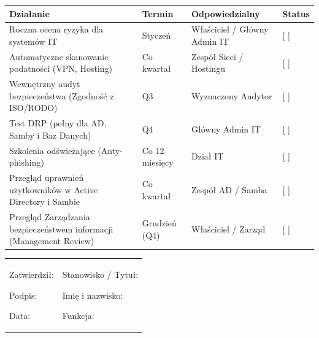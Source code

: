 \documentclass[12pt,a4paper]{article}
\begin{document}
\begin{longtable}[]{@{}>{\raggedright\arraybackslash}p{}>{\raggedright\arraybackslash}p{}>{\raggedright\arraybackslash}p{}>{\raggedright\arraybackslash}p{}@{}}
\toprule\noalign{}
Działanie & Termin & Odpowiedzialny & Status \\
\midrule\noalign{}
\endhead
\bottomrule\noalign{}
\endlastfoot
Roczna ocena ryzyka dla systemów IT & Styczeń & Właściciel / Główny Admin IT & {[} {]} \underline{\hspace{2cm}} \\
Automatyczne skanowanie podatności (VPN, Hosting) & Co kwartał & Zespół Sieci / Hostingu & {[} {]} \underline{\hspace{2cm}} \\
Wewnętrzny audyt bezpieczeństwa (Zgodność z ISO/RODO) & Q3 & Wyznaczony Audytor & {[} {]} \underline{\hspace{2cm}} \\
Test DRP (pełny dla AD, Samby i Baz Danych) & Q4 & Główny Admin IT & {[} {]} \underline{\hspace{2cm}} \\
Szkolenia odświeżające (Anty-phishing) & Co 12 miesięcy & Dział IT & {[} {]} \underline{\hspace{2cm}} \\
Przegląd uprawnień użytkowników w Active Directory i Sambie & Co kwartał & Zespół AD / Samba & {[} {]} \underline{\hspace{2cm}} \\
Przegląd Zarządzania bezpieczeństwem informacji (Management Review) & Grudzień (Q4) & Właściciel / Zarząd & {[} {]}\underline{\hspace{2cm}} \\
\end{longtable}

\begin{longtable}[]{@{}
  >{\raggedright\arraybackslash}p{}
  >{\raggedright\arraybackslash}p{}@{}}
\toprule\noalign{}
\endhead
\bottomrule\noalign{}
\endlastfoot
\begin{minipage}[t]{\linewidth}\raggedright
Zatwierdził:

Podpis: \underline{\hspace{3cm}}

Data: \underline{\hspace{4cm}}
\end{minipage} & \begin{minipage}[t]{\linewidth}\raggedright
Stanowisko / Tytuł:

Imię i nazwisko: \underline{\hspace{3cm}}

Funkcja: \underline{\hspace{3cm}}
\end{minipage} \\
\end{longtable}
\end{document}
